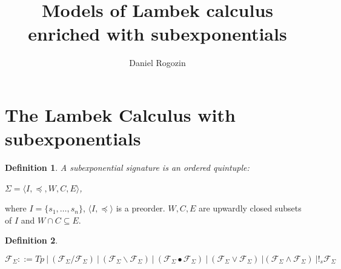 \documentclass[a4paper]{article}
\date{}
\author[1,2]{Daniel Rogozin}
\affil[1]{Lomonosov Moscow State University}
\affil[2]{Serokell O\"{U}}
\title{Models of Lambek calculus enriched with subexponentials}
\theoremstyle{defin}
\newtheorem{defin}{Definition}
\theoremstyle{theorem}
\theoremstyle{prop}
\theoremstyle{lemma}
\theoremstyle{ex}
\theoremstyle{col}
\begin{document}
\maketitle

\begin{abstract}
\end{abstract}

\section{The Lambek Calculus with subexponentials}

\begin{defin} A subexponential signature is an ordered quintuple:

  $\Sigma = \langle I, \preceq, W, C, E \rangle$,
\end{defin}

where $I = \{ s_1, \dots, s_n\}$, $\langle I, \preceq \rangle$ is a preorder.
$W, C, E$ are upwardly closed subsets of $I$ and $W \cap C \subseteq E$.


\begin{defin}
$ $

  $\mathcal{F}_{\Sigma} ::= Tp \: | \: (\mathcal{F}_{\Sigma} / \mathcal{F}_{\Sigma}) \: | \: (\mathcal{F}_{\Sigma} \backslash \mathcal{F}_{\Sigma}) \: | \: (\mathcal{F}_{\Sigma} \bullet \mathcal{F}_{\Sigma}) \: | \: (\mathcal{F}_{\Sigma} \lor \mathcal{F}_{\Sigma}) \: | (\mathcal{F}_{\Sigma} \land \mathcal{F}_{\Sigma}) \: | !_s \mathcal{F}_{\Sigma} $
\end{defin}
\end{document}
